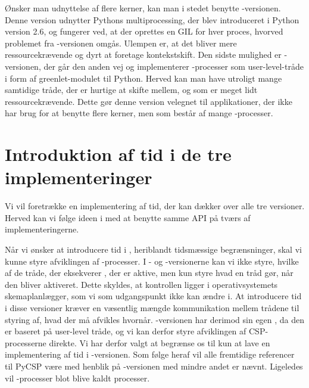 Ønsker man udnyttelse af flere kerner, kan man i stedet benytte -versionen. Denne version udnytter Pythons multiprocessing, der blev introduceret i Python version 2.6, og fungerer ved, at der oprettes en GIL for hver proces, hvorved problemet fra -versionen omgås. Ulempen er, at det bliver mere ressourcekrævende og dyrt at foretage kontekstskift.
Den sidste mulighed er -versionen, der går den anden vej og implementerer \csp-processer som user-level-tråde i form af greenlet-modulet til Python\cite{greenlet}. Herved kan man have utroligt mange samtidige tråde, der er hurtige at skifte mellem, og som er meget lidt ressourcekrævende. Dette gør denne version velegnet til applikationer, der ikke har brug for at benytte flere kerner, men som består af mange \csp-processer. 

\section{Introduktion af tid i de tre implementeringer}
Vi vil foretrække en implementering af tid, der kan dækker over alle tre versioner. Herved kan vi følge ideen i \pycsp med at benytte samme API på tværs af implementeringerne. 

Når vi ønsker at introducere tid i \pycsp, heriblandt tidsmæssige begrænsninger, skal vi kunne styre afviklingen af \csp-processer. I  - og -versionerne kan vi ikke styre, hvilke af de tråde, der eksekverer \csp, der er aktive, men kun styre hvad en tråd gør, når den bliver aktiveret. Dette skyldes, at kontrollen ligger i operativsystemets skemaplanlægger, som vi som udgangspunkt ikke kan ændre i. At introducere tid i disse versioner kræver en væsentlig mængde kommunikation mellem trådene til styring af, hvad der må afvikles hvornår. -versionen har derimod sin egen \sched , da den er baseret på user-level tråde, og vi kan derfor styre afviklingen af CSP-processerne direkte. Vi har derfor valgt at begrænse os til kun at lave en implementering af tid i -versionen. Som følge heraf vil alle fremtidige referencer til PyCSP være med henblik på -versionen med mindre andet er nævnt. Ligeledes vil \csp-processer  blot blive  kaldt  processer. 

